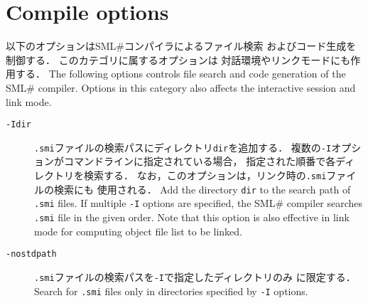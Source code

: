 \documentclass{jbook}
\newcommand{\txt}[2]{#2}
\newcommand{\smlsharp}{SML\#}
\newcommand{\term}[1]{\mbox{{\tt #1}}}
\begin{document}
\section{\txt{コンパイルオプション}{Compile options}}

\ifjp%
	以下のオプションは\smlsharp{}コンパイラによるファイル検索
およびコード生成を制御する．
	このカテゴリに属するオプションは
対話環境やリンクモードにも作用する．
\else%
	The following options controls file search and code generation
of the \smlsharp{} compiler.
	Options in this category also affects the interactive session
and link mode.
\fi%

\begin{description}
\item[{\tt -I\term{dir}}]
\ifjp%
	{\tt .smi}ファイルの検索パスにディレクトリ\term{dir}を追加する．
	複数の{\tt -I}オプションがコマンドラインに指定されている場合，
指定された順番で各ディレクトリを検索する．
	なお，このオプションは，リンク時の{\tt .smi}ファイルの検索にも
使用される．
\else%
	Add the directory \term{dir} to the search path of {\tt .smi}
files.
	If multiple {\tt -I} options are specified,
the \smlsharp{} compiler searches {\tt .smi} file in the given order.
	Note that this option is also effective in link mode for
computing object file list to be linked.
\fi%

\item[{\tt -nostdpath}]
\ifjp%
	{\tt .smi}ファイルの検索パスを{\tt -I}で指定したディレクトリのみ
に限定する．
\else%
	Search for {\tt .smi} files only in directories specified by
{\tt -I} options.
\fi%


\end{description}
\end{document}
